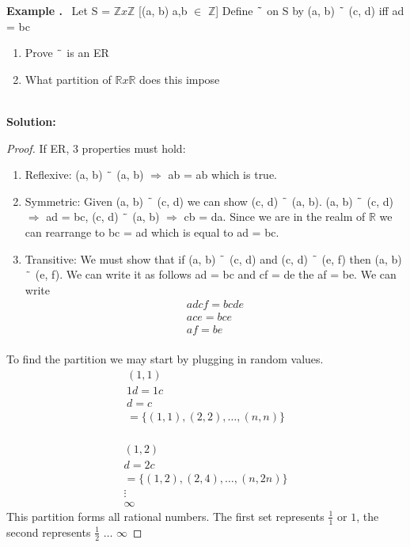 \documentclass{article}
\newcounter{example}
\newcounter{solution}
\theoremstyle{definition}
\theoremstyle{claim}
\theoremstyle{remark}
\theoremstyle{theorem}
\newcommand\Example{%
  \stepcounter{example}%
  \textbf{Example \theexample.}~%
  \setcounter{solution}{0}%
}
\newcommand\TheSolution{%
  \textbf{Solution:}\\%
}
\begin{document}
\begin{flushleft}
\Example Let S = $\mathbb{Z}x\mathbb{Z}$ [(a, b) a,b $\in$ $\mathbb{Z}$]
Define $\char`\~$ on S by (a, b) $\char`\~$ (c, d) iff ad = bc
\begin{enumerate}
  \item Prove $\char`\~$ is an ER
  \item What partition of $\mathbb{R}x\mathbb{R}$ does this impose
\end{enumerate}\\
\TheSolution 
\begin{proof}
If ER, 3 properties must hold:
\begin{enumerate}
  \item Reflexive: (a, b) $\char`\~$ (a, b) $\Longrightarrow$ ab = ab which is true.
  \item Symmetric: Given (a, b) $\char`\~$ (c, d) we can show (c, d) $\char`\~$ (a, b). (a, b) $\char`\~$ (c, d) $\Longrightarrow$ ad = bc, (c, d) $\char`\~$ (a, b) $\Longrightarrow$ cb = da. Since we are in the realm of $\mathbb{R}$ we can rearrange to bc = ad which is equal to ad = bc.
  \item Transitive: We must show that if (a, b) $\char`\~$ (c, d) and (c, d) $\char`\~$ (e, f) then (a, b) $\char`\~$ (e, f). We can write it as follows ad = bc and cf = de  the af = be.
  We can write 
  \begin{gather*} 
  adcf = bcde   \\
  ace = bce     \\
  af = be       \\
  \end{gather*} 
\end{enumerate}
To find the partition we may start by plugging in random values.\\
\begin{gather*} 
(1, 1)  \\
1d = 1c \\
d = c   \\
= \{(1, 1), (2, 2), \dots, (n, n)\}
\end{gather*}\\
\begin{gather*} 
(1, 2)\\
d = 2c\\
= \{(1, 2), (2, 4), \dots, (n, 2n)\}\\
\vdots\\
\infty
\end{gather*} 
This partition forms all rational numbers. The first set represents $\frac{1}{1}$ or $1$, the second represents $\frac{1}{2}$ $\dots$ $\infty$

\end{proof}
\end{flushleft}
\end{document}
